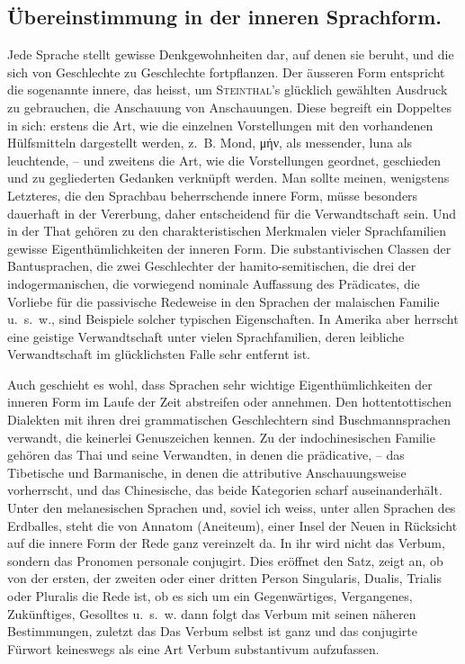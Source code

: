 \subsection*{ Übereinstimmung in der inneren Sprachform.}\label{III.I.I.2Adgamma}
 Jede Sprache stellt gewisse Denkgewohnheiten dar, auf denen sie beruht, und die sich von Geschlechte zu Geschlechte fortpflanzen. Der äusseren Form entspricht die sogenannte innere, das heisst, um \textsc{Steinthal}’s glücklich gewählten Ausdruck zu gebrauchen, die Anschauung von Anschauungen. Diese begreift ein Doppeltes in sich: erstens die Art, wie die einzelnen Vorstellungen mit den vorhandenen Hülfsmitteln dargestellt werden, z.~B. Mond, μήν, als messender, luna als leuchtende, – und zweitens die Art, wie die Vorstellungen geordnet, geschieden und zu gegliederten Gedanken verknüpft werden. Man sollte meinen, wenigstens Letzteres, die den Sprachbau beherrschende innere Form, müsse besonders dauerhaft in der Vererbung, daher entscheidend für die Verwandtschaft sein. Und in der That gehören zu den charakteristischen Merkmalen vieler Sprachfamilien gewisse Eigenthümlichkeiten der inneren Form. Die substantivischen Classen der Bantusprachen, die zwei Geschlechter der hamito-semitischen, die drei der indogermanischen, die vorwiegend nominale Auffassung des Prädicates, die Vorliebe für die passivische Redeweise in den Sprachen der malaischen Familie u.~s.~w., sind Beispiele solcher typischen Eigenschaften. In Amerika aber herrscht eine geistige Verwandtschaft unter vielen Sprachfamilien, deren leibliche Verwandtschaft im glücklichsten Falle sehr entfernt ist.

Auch geschieht es wohl, dass Sprachen sehr wichtige Eigenthümlichkeiten der inneren Form im Laufe der Zeit abstreifen oder annehmen. Den hottentottischen Dialekten mit ihren drei grammatischen Geschlechtern sind Buschmannsprachen verwandt, die keinerlei Genuszeichen kennen. Zu der indo\label{sp.151}chi\-ne\-si\-schen Familie gehören das Thai  und seine Verwandten, in denen die prädicative, – das Tibetische und Barmanische, in denen die attributive Anschauungsweise vorherrscht, und das Chinesische, das beide Kategorien scharf auseinanderhält. Unter den melanesischen Sprachen und, soviel ich weiss, unter allen Sprachen des Erdballes, steht die von Annatom (Aneiteum), einer Insel der Neuen  in Rücksicht auf die innere Form der Rede ganz vereinzelt da. In ihr wird nicht das Verbum, sondern das Pronomen personale conjugirt. Dies \label{fp.161} eröffnet den Satz, zeigt an, ob von der ersten, der zweiten oder einer dritten Person Singularis, Dualis, Trialis oder Pluralis die Rede ist, ob es sich um ein Gegenwärtiges, Vergangenes, Zukünftiges, Gesolltes u.~s.~w.  dann folgt das Verbum mit seinen näheren Bestimmungen, zuletzt das   Das Verbum selbst ist ganz  und das conjugirte Fürwort keineswegs als eine Art Verbum substantivum aufzufassen. 

